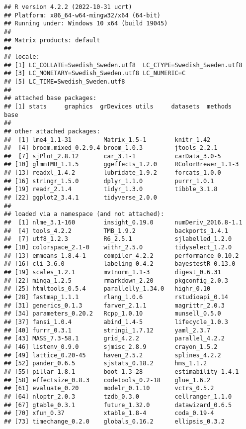 \documentclass[
]{article}
\begin{document}
\begin{verbatim}
## R version 4.2.2 (2022-10-31 ucrt)
## Platform: x86_64-w64-mingw32/x64 (64-bit)
## Running under: Windows 10 x64 (build 19045)
## 
## Matrix products: default
## 
## locale:
## [1] LC_COLLATE=Swedish_Sweden.utf8  LC_CTYPE=Swedish_Sweden.utf8   
## [3] LC_MONETARY=Swedish_Sweden.utf8 LC_NUMERIC=C                   
## [5] LC_TIME=Swedish_Sweden.utf8    
## 
## attached base packages:
## [1] stats     graphics  grDevices utils     datasets  methods   base     
## 
## other attached packages:
##  [1] lme4_1.1-31         Matrix_1.5-1        knitr_1.42         
##  [4] broom.mixed_0.2.9.4 broom_1.0.3         jtools_2.2.1       
##  [7] sjPlot_2.8.12       car_3.1-1           carData_3.0-5      
## [10] glmmTMB_1.1.5       ggeffects_1.2.0     RColorBrewer_1.1-3 
## [13] readxl_1.4.2        lubridate_1.9.2     forcats_1.0.0      
## [16] stringr_1.5.0       dplyr_1.1.0         purrr_1.0.1        
## [19] readr_2.1.4         tidyr_1.3.0         tibble_3.1.8       
## [22] ggplot2_3.4.1       tidyverse_2.0.0    
## 
## loaded via a namespace (and not attached):
##  [1] nlme_3.1-160        insight_0.19.0      numDeriv_2016.8-1.1
##  [4] tools_4.2.2         TMB_1.9.2           backports_1.4.1    
##  [7] utf8_1.2.3          R6_2.5.1            sjlabelled_1.2.0   
## [10] colorspace_2.1-0    withr_2.5.0         tidyselect_1.2.0   
## [13] emmeans_1.8.4-1     compiler_4.2.2      performance_0.10.2 
## [16] cli_3.6.0           labeling_0.4.2      bayestestR_0.13.0  
## [19] scales_1.2.1        mvtnorm_1.1-3       digest_0.6.31      
## [22] minqa_1.2.5         rmarkdown_2.20      pkgconfig_2.0.3    
## [25] htmltools_0.5.4     parallelly_1.34.0   highr_0.10         
## [28] fastmap_1.1.1       rlang_1.0.6         rstudioapi_0.14    
## [31] generics_0.1.3      farver_2.1.1        magrittr_2.0.3     
## [34] parameters_0.20.2   Rcpp_1.0.10         munsell_0.5.0      
## [37] fansi_1.0.4         abind_1.4-5         lifecycle_1.0.3    
## [40] furrr_0.3.1         stringi_1.7.12      yaml_2.3.7         
## [43] MASS_7.3-58.1       grid_4.2.2          parallel_4.2.2     
## [46] listenv_0.9.0       sjmisc_2.8.9        crayon_1.5.2       
## [49] lattice_0.20-45     haven_2.5.2         splines_4.2.2      
## [52] pander_0.6.5        sjstats_0.18.2      hms_1.1.2          
## [55] pillar_1.8.1        boot_1.3-28         estimability_1.4.1 
## [58] effectsize_0.8.3    codetools_0.2-18    glue_1.6.2         
## [61] evaluate_0.20       modelr_0.1.10       vctrs_0.5.2        
## [64] nloptr_2.0.3        tzdb_0.3.0          cellranger_1.1.0   
## [67] gtable_0.3.1        future_1.32.0       datawizard_0.6.5   
## [70] xfun_0.37           xtable_1.8-4        coda_0.19-4        
## [73] timechange_0.2.0    globals_0.16.2      ellipsis_0.3.2
\end{verbatim}
\end{document}
